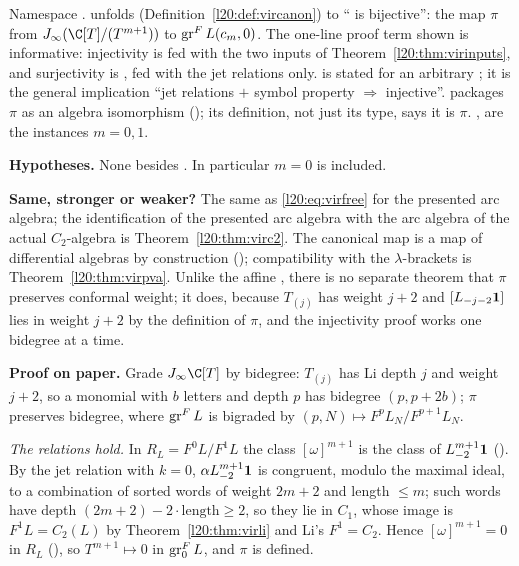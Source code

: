 \begin{dictionary}
Namespace .  unfolds (Definition~\ref{l20:def:vircanon}) to
`` is bijective'': the map $\pi$ from
$\ltwentyJ(\C[T]/(T^{m+1}))$ to $\operatorname{gr}^F L(c_m,0)$. The one-line proof term shown is informative: injectivity is
 fed with the two inputs of Theorem~\ref{l20:thm:virinputs}, and surjectivity is
, fed with the jet relations only.  is stated for an arbitrary
; it is the general implication ``jet relations $+$ symbol property $\Rightarrow$ injective''.
 packages $\pi$ as an algebra isomorphism (); its definition, not just its
type, says it is $\pi$. ,  are the instances $m=0,1$.

\textbf{Hypotheses.} None besides . In particular $m=0$ is included.

\textbf{Same, stronger or weaker?} The same as \eqref{l20:eq:virfree} for the presented arc algebra; the identification of
the presented arc algebra with the arc algebra of the actual $C_2$-algebra is Theorem~\ref{l20:thm:virc2}. The canonical map is
a map of differential algebras by construction (); compatibility with the $\lambda$-brackets is
Theorem~\ref{l20:thm:virpva}. Unlike the affine , there is no separate theorem that
$\pi$ preserves conformal weight; it does, because $T_{(j)}$ has weight $j+2$ and $[L_{-j-2}\mathbf{1}]$ lies in weight $j+2$
by the definition of $\pi$, and the injectivity proof works one bidegree at a time.
\end{dictionary}

\textbf{Proof on paper.} Grade $\ltwentyJ\C[T]$ by bidegree: $T_{(j)}$ has Li depth $j$ and weight $j+2$, so a monomial with
$b$ letters and depth $p$ has bidegree $(p,p+2b)$; $\pi$ preserves bidegree, where $\operatorname{gr}^F L$ is bigraded by
$(p,N)\mapsto F^pL_N/F^{p+1}L_N$.

\emph{The relations hold.} In $R_L=F^0L/F^1L$ the class $[\omega]^{m+1}$ is the class of $L_{-2}^{m+1}\mathbf{1}$
(). By the jet relation with $k=0$, $\alpha L_{-2}^{m+1}\mathbf{1}$ is congruent, modulo the maximal
ideal, to a combination of sorted words of weight $2m+2$ and length $\le m$; such words have depth $(2m+2)-2\cdot\text{length}\ge2$,
so they lie in $C_1$, whose image is $F^1L=C_2(L)$ by Theorem~\ref{l20:thm:virli} and Li's $F^1=C_2$. Hence $[\omega]^{m+1}=0$ in
$R_L$ (), so $T^{m+1}\mapsto0$ in $\operatorname{gr}^F_0L$, and $\pi$ is defined.

